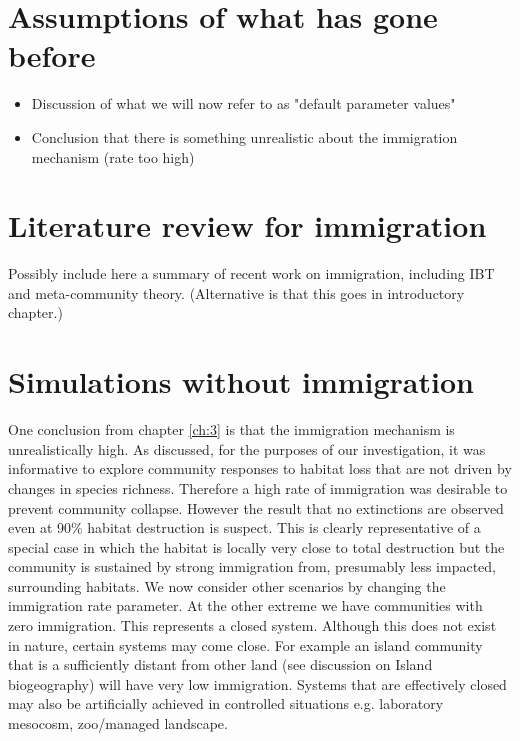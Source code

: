\section{Assumptions of what has gone before}

\begin{itemize}
	\item Discussion of what we will now refer to as "default parameter values"
	\item Conclusion that there is something unrealistic about the immigration mechanism (rate too high)
\end{itemize}

\section{Literature review for immigration}

Possibly include here a summary of recent work on immigration, including IBT and meta-community theory. (Alternative is that this goes in introductory chapter.)

\section{Simulations without immigration}
\label{sec:no_immigration}

One conclusion from chapter \ref{ch:3} is that the immigration mechanism is unrealistically high. As discussed, for the purposes of our investigation, it was informative to explore community responses to habitat loss that are not driven by changes in species richness. Therefore a high rate of immigration was desirable to prevent community collapse. However the result that no extinctions are observed even at 90\% habitat destruction is suspect. This is clearly representative of a special case in which the habitat is locally very close to total destruction but the community is sustained by strong immigration from, presumably less impacted, surrounding habitats. We now consider other scenarios by changing the immigration rate parameter. At the other extreme we have communities with zero immigration. This represents a closed system. Although this does not exist in nature, certain systems may come close. For example an island community that is a sufficiently distant from other land (see discussion on Island biogeography) will have very low immigration. Systems that are effectively closed may also be artificially achieved in controlled situations e.g. laboratory mesocosm, zoo/managed landscape.

